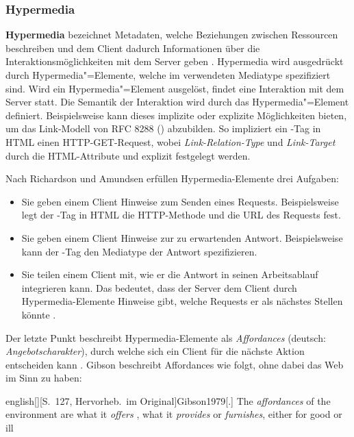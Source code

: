 \subsubsection{Hypermedia}
\textbf{Hypermedia} bezeichnet Metadaten, welche Beziehungen zwischen Ressourcen beschreiben und dem Client dadurch Informationen über die Interaktionsmöglichkeiten mit dem Server geben \autocite[S.~45]{Richardson2013}. Hypermedia wird ausgedrückt durch Hypermedia"=Elemente, welche im verwendeten Mediatype spezifiziert sind. Wird ein Hypermedia"=Element ausgelöst, findet eine Interaktion mit dem Server statt. Die Semantik der Interaktion wird durch das Hypermedia"=Element definiert. Beispielsweise kann dieses implizite oder explizite Möglichkeiten bieten, um das Link-Modell von RFC 8288 (\autocite[Abs.~2]{RFC8288}) abzubilden. So impliziert ein -Tag in HTML einen HTTP-GET-Request, wobei \textit{Link-Relation-Type} und \textit{Link-Target} durch die HTML-Attribute  und  explizit festgelegt werden.

\para{}Nach Richardson und Amundsen erfüllen Hypermedia-Elemente drei Aufgaben:

\begin{itemize}[noitemsep,topsep=0pt]
    \item Sie geben einem Client Hinweise zum Senden eines Requests. Beispielsweise legt der -Tag in HTML die HTTP-Methode und die URL des Requests fest.
    \item Sie geben einem Client Hinweise zur zu erwartenden Antwort. Beispielsweise kann der -Tag den Mediatype der Antwort spezifizieren.
    \item Sie teilen einem Client mit, wie er die Antwort in seinen Arbeitsablauf integrieren kann. Das bedeutet, dass der Server dem Client durch Hypermedia-Elemente Hinweise gibt, welche Requests er als nächstes Stellen könnte \autocite[S.~52]{Richardson2013}.
\end{itemize}
Der letzte Punkt beschreibt Hypermedia-Elemente als \emph{Affordances} (deutsch: \textit{Angebotscharakter}), durch welche sich ein Client für die nächste Aktion entscheiden kann \autocite{Fielding2008}. Gibson beschreibt Affordances wie folgt, ohne dabei das Web im Sinn zu haben:

\begin{foreigndisplaycquote}{english}[][S.~127, Hervorheb.\ im Original]{Gibson1979}[.]
    The \emph{affordances} of the environment are what it \emph{offers} \textins{\dots}, what it \emph{provides} or \emph{furnishes}, either for good or ill
\end{foreigndisplaycquote}

